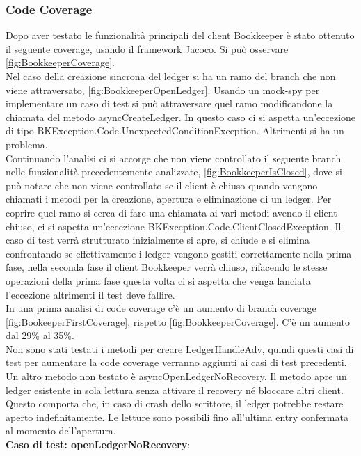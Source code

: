 \documentclass[10pt]{article}
\begin{document}
{		\subsubsection{Code Coverage}
		Dopo aver testato le funzionalità principali del client Bookkeeper è stato ottenuto il seguente coverage, 
		usando il framework Jacoco. Si può osservare \autoref{fig:BookkeeperCoverage}.\\
		Nel caso della creazione sincrona del ledger si ha un ramo del branch che non viene attraversato, \autoref{fig:BookkeeperOpenLedger}. Usando un mock-spy per implementare un caso di test si può attraversare quel ramo modificandone la chiamata del metodo asyncCreateLedger. In questo caso ci si aspetta un'eccezione di tipo BKException.Code.UnexpectedConditionException. Altrimenti si ha un problema.\\
		Continuando l'analisi ci si accorge che non viene controllato il seguente branch nelle funzionalità precedentemente analizzate, \autoref{fig:BookkeeperIsClosed}, dove si può notare che non viene controllato se il client è chiuso quando vengono chiamati i metodi per la creazione, apertura e eliminazione di un ledger. Per coprire quel ramo si cerca di fare una chiamata ai vari metodi avendo il client chiuso, ci si aspetta un'eccezione BKException.Code.ClientClosedException.
		Il caso di test verrà strutturato inizialmente si apre, si chiude e si elimina confrontando se effettivamente i ledger vengono gestiti correttamente nella prima fase, nella seconda fase il client Bookkeeper verrà chiuso, rifacendo le stesse operazioni della prima fase questa volta ci si aspetta che venga lanciata l'eccezione altrimenti il test deve fallire.\\
		In una prima analisi di code coverage c'è un aumento di branch coverage \autoref{fig:BookeeperFirstCoverage}, rispetto \autoref{fig:BookkeeperCoverage}. C'è un aumento dal 29\% al 35\%.\\
		Non sono stati testati i metodi per creare LedgerHandleAdv, quindi questi casi di test per aumentare la code coverage verranno aggiunti ai casi di test precedenti. Un altro metodo non testato è asyncOpenLedgerNoRecovery. Il metodo apre un ledger esistente in sola lettura senza attivare il recovery né bloccare altri client. Questo comporta che, in caso di crash dello scrittore, il ledger potrebbe restare aperto indefinitamente. Le letture sono possibili fino all'ultima entry confermata al momento dell'apertura. \\ 
		\textbf{Caso di test: openLedgerNoRecovery}: 
		\begin{itemize}[label=--, itemsep=2pt, parsep=0pt]

\end{itemize}}
\end{document}
